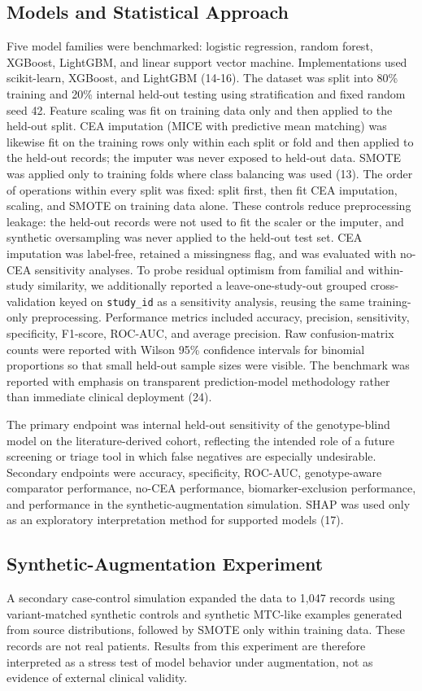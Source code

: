 \documentclass[12pt]{article}
\begin{document}
\subsection{Models and Statistical Approach}
Five model families were benchmarked: logistic regression, random forest, XGBoost, LightGBM, and linear support vector machine. Implementations used scikit-learn, XGBoost, and LightGBM (14-16). The dataset was split into 80\% training and 20\% internal held-out testing using stratification and fixed random seed 42. Feature scaling was fit on training data only and then applied to the held-out split. CEA imputation (MICE with predictive mean matching) was likewise fit on the training rows only within each split or fold and then applied to the held-out records; the imputer was never exposed to held-out data. SMOTE was applied only to training folds where class balancing was used (13). The order of operations within every split was fixed: split first, then fit CEA imputation, scaling, and SMOTE on training data alone. These controls reduce preprocessing leakage: the held-out records were not used to fit the scaler or the imputer, and synthetic oversampling was never applied to the held-out test set. CEA imputation was label-free, retained a missingness flag, and was evaluated with no-CEA sensitivity analyses. To probe residual optimism from familial and within-study similarity, we additionally reported a leave-one-study-out grouped cross-validation keyed on \texttt{study\_id} as a sensitivity analysis, reusing the same training-only preprocessing. Performance metrics included accuracy, precision, sensitivity, specificity, F1-score, ROC-AUC, and average precision. Raw confusion-matrix counts were reported with Wilson 95\% confidence intervals for binomial proportions so that small held-out sample sizes were visible. The benchmark was reported with emphasis on transparent prediction-model methodology rather than immediate clinical deployment (24).

The primary endpoint was internal held-out sensitivity of the genotype-blind model on the literature-derived cohort, reflecting the intended role of a future screening or triage tool in which false negatives are especially undesirable. Secondary endpoints were accuracy, specificity, ROC-AUC, genotype-aware comparator performance, no-CEA performance, biomarker-exclusion performance, and performance in the synthetic-augmentation simulation. SHAP was used only as an exploratory interpretation method for supported models (17).

\subsection{Synthetic-Augmentation Experiment}
A secondary case-control simulation expanded the data to 1,047 records using variant-matched synthetic controls and synthetic MTC-like examples generated from source distributions, followed by SMOTE only within training data. These records are not real patients. Results from this experiment are therefore interpreted as a stress test of model behavior under augmentation, not as evidence of external clinical validity.
\end{document}

